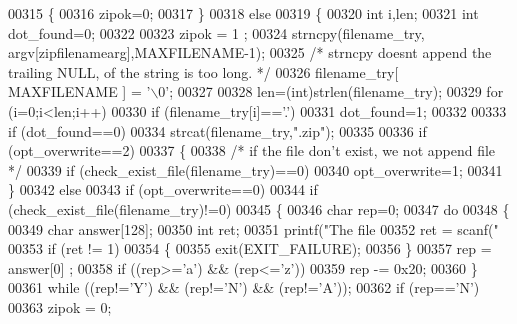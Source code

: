 \begin{DoxyCode}
{{{00315     \{
00316         zipok=0;
00317     \}
00318     \textcolor{keywordflow}{else}
00319     \{
00320         \textcolor{keywordtype}{int} i,len;
00321         \textcolor{keywordtype}{int} dot\_found=0;
00322 
00323         zipok = 1 ;
00324         strncpy(filename\_try, argv[zipfilenamearg],MAXFILENAME-1);
00325         \textcolor{comment}{/* strncpy doesnt append the trailing NULL, of the string is too long. */}
00326         filename\_try[ MAXFILENAME ] = \textcolor{charliteral}{'\(\backslash\)0'};
00327 
00328         len=(int)strlen(filename\_try);
00329         \textcolor{keywordflow}{for} (i=0;i<len;i++)
00330             \textcolor{keywordflow}{if} (filename\_try[i]==\textcolor{charliteral}{'.'})
00331                 dot\_found=1;
00332 
00333         \textcolor{keywordflow}{if} (dot\_found==0)
00334             strcat(filename\_try,\textcolor{stringliteral}{".zip"});
00335 
00336         \textcolor{keywordflow}{if} (opt\_overwrite==2)
00337         \{
00338             \textcolor{comment}{/* if the file don't exist, we not append file */}
00339             \textcolor{keywordflow}{if} (check\_exist\_file(filename\_try)==0)
00340                 opt\_overwrite=1;
00341         \}
00342         \textcolor{keywordflow}{else}
00343         \textcolor{keywordflow}{if} (opt\_overwrite==0)
00344             \textcolor{keywordflow}{if} (check\_exist\_file(filename\_try)!=0)
00345             \{
00346                 \textcolor{keywordtype}{char} rep=0;
00347                 \textcolor{keywordflow}{do}
00348                 \{
00349                     \textcolor{keywordtype}{char} answer[128];
00350                     \textcolor{keywordtype}{int} ret;
00351                     printf(\textcolor{stringliteral}{"The file %
00352                     ret = scanf(\textcolor{stringliteral}{"%
00353                     \textcolor{keywordflow}{if} (ret != 1)
00354                     \{
00355                        exit(EXIT\_FAILURE);
00356                     \}
00357                     rep = answer[0] ;
00358                     \textcolor{keywordflow}{if} ((rep>=\textcolor{charliteral}{'a'}) && (rep<=\textcolor{charliteral}{'z'}))
00359                         rep -= 0x20;
00360                 \}
00361                 \textcolor{keywordflow}{while} ((rep!=\textcolor{charliteral}{'Y'}) && (rep!=\textcolor{charliteral}{'N'}) && (rep!=\textcolor{charliteral}{'A'}));
00362                 \textcolor{keywordflow}{if} (rep==\textcolor{charliteral}{'N'})
00363                     zipok = 0;
}}}}}
\end{DoxyCode}
